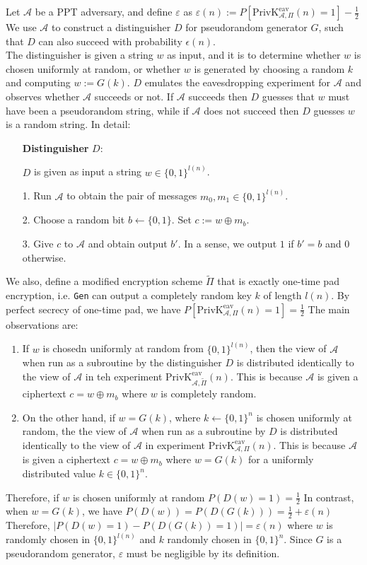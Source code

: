 \documentclass[12pt]{article}
\newcommand\PrivK{\mathrm{PrivK}}
\theoremstyle{definition}
\begin{document}
Let $\mathcal{A}$ be a PPT adversary, and define $\varepsilon$ as
$
\varepsilon(n):=P[\PrivK _{\mathcal{A},\Pi}^\text{eav}(n)=1]-\frac{1}{2}
$
We use $\mathcal{A}$ to construct a distinguisher $D$ for pseudorandom generator $G$, such that $D$ can also succeed with probability $\epsilon(n)$.\\
The distinguisher is given a string $w$ as input, and it is to determine whether $w$ is chosen uniformly at random, or whether $w$ is generated by choosing a random $k$ and computing $w:=G(k)$. $D$ emulates the eavesdropping experiment for $\mathcal{A}$ and observes whether $\mathcal{A}$ succeeds or not. If $\mathcal{A}$ succeeds then $D$ guesses that $w$ must have been a pseudorandom string, while if $\mathcal{A}$ does not succeed then $D$ guesses $w$ is a random string. In detail:
\begin{itemize}
  \item[] \textbf{Distinguisher} $D$:
  \item[] $D$ is given as input a string $w\in\{0,1\}^{l(n)}$.
  \item[1.] Run $\mathcal{A}$ to obtain the pair of messages $m_0,m_1\in\{0,1\}^{l(n)}$.
  \item[2.] Choose a random bit $b\leftarrow\{0,1\}$. Set $c:=w\oplus m_b$.
  \item[3.] Give $c$ to $\mathcal{A}$ and obtain output $b'$. In a sense, we output $1$ if $b'=b$ and $0$ otherwise.
\end{itemize}
We also, define a modified encryption scheme $\tilde{\Pi}$ that is exactly one-time pad encryption, i.e. \texttt{Gen} can output a completely random key $k$ of length $l(n)$. By perfect secrecy of one-time pad, we have
$
P[\PrivK _{\mathcal{A},\Pi}^\text{eav}(n)=1]=\frac{1}{2}
$
The main observations are:
\begin{enumerate}
  \item If $w$ is chosedn uniformly at random from $\{0,1\}^{l(n)}$, then the view of $\mathcal{A}$ when run as a subroutine by the distinguisher $D$ is distributed identically to the view of $\mathcal{A}$ in teh experiment $\PrivK _{\mathcal{A},\tilde{\Pi}}^\text{eav}(n)$. This is because $\mathcal{A}$ is given a ciphertext $c=w\oplus m_b$ where $w$ is completely random.
  \item On the other hand, if $w=G(k)$, where $k\leftarrow\{0,1\}^n$ is chosen uniformly at random, the the view of $\mathcal{A}$ when run as a subroutine by $D$ is distributed identically to the view of $\mathcal{A}$ in experiment $\PrivK _{\mathcal{A},\Pi}^\text{eav}(n)$. This is because $\mathcal{A}$ is given a ciphertext $c=w\oplus m_b$ where $w=G(k)$ for a uniformly distributed value $k\in \{0,1\}^n$.
\end{enumerate}
Therefore, if $w$ is chosen uniformly at random 
$
P(D(w)=1)=\frac{1}{2}
$
In contrast, when $w=G(k)$, we have
$
P(D(w))=P(D(G(k)))=\frac{1}{2}+\varepsilon(n)
$
Therefore, 
$
|P(D(w)=1)-P(D(G(k))=1)|=\varepsilon(n)
$
where $w$ is randomly chosen in $\{0,1\}^{l(n)}$ and $k$ randomly chosen in $\{0,1\}^{n}$. Since $G$ is a pseudorandom generator, $\varepsilon$ must be negligible by its definition.  
\end{document}
